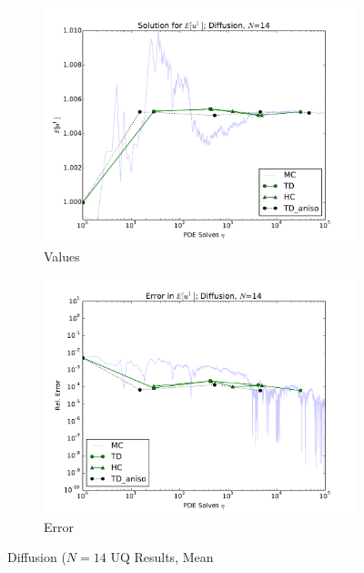 \documentclass[11pt]{article}
\begin{document}
\begin{figure}[H]
    \centering
    \begin{subfigure}[b]{0.49 \textwidth}
      \includegraphics[width=\textwidth]{../graphics/N14_aniso_vals}
      \caption{Values}
      \label{atn vals hdmr}
  \end{subfigure}
\begin{subfigure}[b]{0.49 \textwidth}
\centering
      \includegraphics[width=\textwidth]{../graphics/N14_aniso_errs}
      \caption{Error}
      \label{atn errs hdmr}
    \end{subfigure}
  \caption{Diffusion ($N=14$ UQ Results, Mean}
  \label{diff5 anis mean}
  \end{figure}
\end{document}
